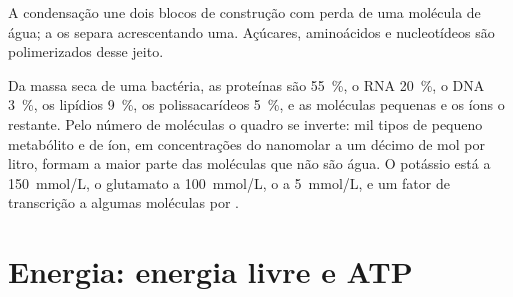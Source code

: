 \begin{omfigure}

{\small A condensação une dois blocos de construção com perda de uma
molécula de água; a  os separa acrescentando uma. Açúcares,
aminoácidos e nucleotídeos são polimerizados desse jeito.}
\end{omfigure}

\begin{example}\label{ex:b1:water-small-molecules:inventory}
Da massa seca de uma bactéria, as proteínas são \qty{55}{\%}, o RNA
\qty{20}{\%}, o DNA \qty{3}{\%}, os lipídios \qty{9}{\%}, os
polissacarídeos \qty{5}{\%}, e as moléculas pequenas e os íons o
restante. Pelo número de moléculas o quadro se inverte: mil tipos de
pequeno metabólito e de íon, em concentrações do nanomolar a um décimo
de mol por litro, formam a maior parte das moléculas que não são água. O
potássio está a \qty{150}{mmol/L}, o glutamato a \qty{100}{mmol/L}, o
 a \qty{5}{mmol/L}, e um fator de transcrição a algumas moléculas por
.
\end{example}

\section{Energia: energia livre e ATP}

